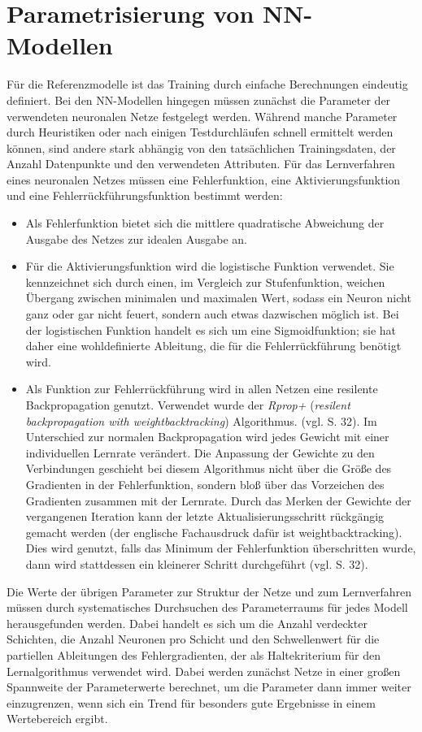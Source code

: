 \documentclass[
	12pt,
	a4paper,
	BCOR10mm,
	DIV14,
	listof=totoc,
	bibliography=totoc,
	headsepline
]{scrreprt}
\begin{document}
\section{Parametrisierung von NN-Modellen}
\label{parametrisierung}
Für die Referenzmodelle ist das Training durch einfache Berechnungen eindeutig definiert.
Bei den NN-Modellen hingegen müssen zunächst die Parameter der verwendeten neuronalen Netze festgelegt werden. 
Während manche Parameter durch Heuristiken oder nach einigen Testdurchläufen schnell ermittelt werden können, sind andere stark abhängig von den tatsächlichen Trainingsdaten, der Anzahl Datenpunkte und den verwendeten Attributen. Für das Lernverfahren eines neuronalen Netzes müssen eine Fehlerfunktion, eine Aktivierungsfunktion und eine Fehlerrückführungsfunktion bestimmt werden: 
\begin{itemize}
\item Als Fehlerfunktion bietet sich die mittlere quadratische Abweichung der Ausgabe des Netzes zur idealen Ausgabe an.
\item Für die Aktivierungsfunktion wird die logistische Funktion verwendet. Sie kennzeichnet sich durch einen, im Vergleich zur Stufenfunktion, weichen Übergang zwischen minimalen und maximalen Wert, sodass ein Neuron nicht ganz oder gar nicht feuert, sondern auch etwas dazwischen möglich ist. Bei der logistischen Funktion handelt es sich um eine Sigmoidfunktion; sie hat daher eine wohldefinierte Ableitung, die für die Fehlerrückführung benötigt wird. 
\item Als Funktion zur Fehlerrückführung wird in allen Netzen eine resilente Backpropagation genutzt. Verwendet wurde der \textit{Rprop+} (\textit{resilent backpropagation with weightbacktracking}) Algorithmus.  (vgl. \cite{gunther2010neuralnet} S. 32).
Im Unterschied zur normalen Backpropagation wird jedes Gewicht mit einer individuellen Lernrate verändert. Die Anpassung der Gewichte zu den Verbindungen geschieht bei diesem Algorithmus nicht über die Größe des Gradienten in der Fehlerfunktion, sondern bloß über das Vorzeichen des Gradienten zusammen mit der Lernrate.
Durch das Merken der Gewichte der vergangenen Iteration kann der letzte Aktualisierungsschritt rückgängig gemacht werden (der englische Fachausdruck dafür ist weightbacktracking). Dies wird genutzt, falls das Minimum der Fehlerfunktion überschritten wurde, dann wird stattdessen ein kleinerer Schritt durchgeführt (vgl. \cite{gunther2010neuralnet} S. 32).
\end{itemize}
Die Werte der übrigen Parameter zur Struktur der Netze und zum Lernverfahren müssen durch systematisches Durchsuchen des Parameterraums für jedes Modell herausgefunden werden. Dabei handelt es sich um die Anzahl verdeckter Schichten, die Anzahl Neuronen pro Schicht und den Schwellenwert für die partiellen Ableitungen des Fehlergradienten, der als Haltekriterium für den Lernalgorithmus verwendet wird.
Dabei werden zunächst Netze in einer großen Spannweite der Parameterwerte berechnet, um die Parameter dann immer weiter einzugrenzen, wenn sich ein Trend für besonders gute Ergebnisse in einem Wertebereich ergibt.
\end{document}
